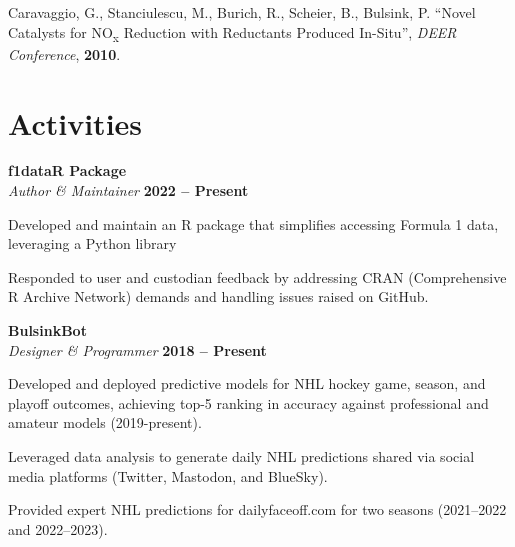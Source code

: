 \documentclass[margin,line]{resumecls}
\begin{document}
\begin{resume}
	\vspace{0mm}
    Caravaggio, G., Stanciulescu, M., Burich, R., Scheier, B., Bulsink, P. ``Novel Catalysts for NO\textsubscript{x} Reduction with Reductants Produced In-Situ'', \textit{DEER Conference}, \textbf{2010}.
\vspace{1mm}

    \newpage
    \section{\mysidestyle Activities}

    \textbf{f1dataR Package}\\\vspace{1mm}%
    \textsl{Author \& Maintainer} \hfill \textbf{2022 -- Present}\\\vspace{-5mm}%
    \begin{list2}
        \item Developed and maintain an R package that simplifies accessing Formula 1 data, leveraging a Python library
        \item Responded to user and custodian feedback by addressing CRAN (Comprehensive R Archive Network) demands and handling issues raised on GitHub.
    \end{list2}

    \textbf{BulsinkBot}\\\vspace{1mm}%
    \textsl{Designer \& Programmer} \hfill \textbf{2018 -- Present}\\\vspace{-5mm}%
    \begin{list2}
        \item Developed and deployed predictive models for NHL hockey game, season, and playoff outcomes, achieving top-5 ranking in accuracy against professional and amateur models (2019-present).
        \item Leveraged data analysis to generate daily NHL predictions shared via social media platforms (Twitter, Mastodon, and BlueSky).
        \item Provided expert NHL predictions for dailyfaceoff.com for two seasons (2021--2022 and 2022--2023).
    \end{list2}


\end{resume}
\end{document}
